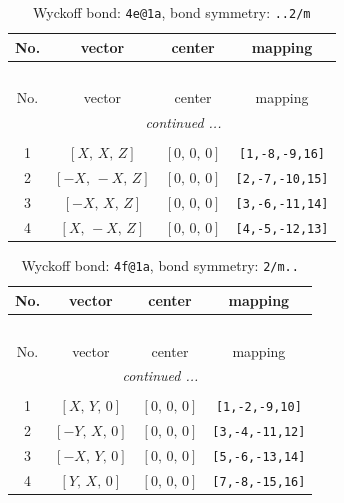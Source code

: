\documentclass[fleqn,8pt]{jsarticle}
\begin{document}
\renewcommand{\arraystretch}{1.2}
\begin{longtable}{cccc}
\caption{Wyckoff bond: {\tt 4e@1a}, bond symmetry: {\tt ..2/m}}
 \\
 \hline \hline
No. & vector & center & mapping \\ \hline \endfirsthead

\multicolumn{3}{l}{\tablename\ \thetable{}} \\
 \hline \hline
No. & vector & center & mapping \\ \hline \endhead

 \hline \hline
\multicolumn{3}{r}{\footnotesize\it continued ...} \\ \endfoot

 \hline \hline
\multicolumn{3}{r}{} \\ \endlastfoot

1 & $\left[ X,\, X,\, Z \right]$ & $\left[ 0,\, 0,\, 0 \right]$ & {\tt [1,-8,-9,16]} \\ \hline
2 & $\left[ - X,\, - X,\, Z \right]$ & $\left[ 0,\, 0,\, 0 \right]$ & {\tt [2,-7,-10,15]} \\ \hline
3 & $\left[ - X,\, X,\, Z \right]$ & $\left[ 0,\, 0,\, 0 \right]$ & {\tt [3,-6,-11,14]} \\ \hline
4 & $\left[ X,\, - X,\, Z \right]$ & $\left[ 0,\, 0,\, 0 \right]$ & {\tt [4,-5,-12,13]} \\
\end{longtable}
\renewcommand{\arraystretch}{1.2}
\begin{longtable}{cccc}
\caption{Wyckoff bond: {\tt 4f@1a}, bond symmetry: {\tt 2/m..}}
 \\
 \hline \hline
No. & vector & center & mapping \\ \hline \endfirsthead

\multicolumn{3}{l}{\tablename\ \thetable{}} \\
 \hline \hline
No. & vector & center & mapping \\ \hline \endhead

 \hline \hline
\multicolumn{3}{r}{\footnotesize\it continued ...} \\ \endfoot

 \hline \hline
\multicolumn{3}{r}{} \\ \endlastfoot

1 & $\left[ X,\, Y,\, 0 \right]$ & $\left[ 0,\, 0,\, 0 \right]$ & {\tt [1,-2,-9,10]} \\ \hline
2 & $\left[ - Y,\, X,\, 0 \right]$ & $\left[ 0,\, 0,\, 0 \right]$ & {\tt [3,-4,-11,12]} \\ \hline
3 & $\left[ - X,\, Y,\, 0 \right]$ & $\left[ 0,\, 0,\, 0 \right]$ & {\tt [5,-6,-13,14]} \\ \hline
4 & $\left[ Y,\, X,\, 0 \right]$ & $\left[ 0,\, 0,\, 0 \right]$ & {\tt [7,-8,-15,16]} \\
\end{longtable}
\end{document}
